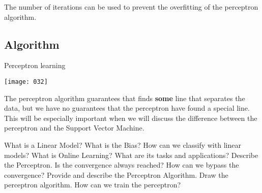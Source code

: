 The number of iterations can be used to prevent the overfitting of the perceptron algorithm.

\subsection{Algorithm}

\begin{algorithm}[h!]
\caption{Perceptron learning}
\label{alg:perceptron}
\end{algorithm}

\begin{center}
    \texttt{[image: 032]}
    \label{fig:032}
\end{center}

The perceptron algorithm guarantees that finds \textbf{some} line that separates the data, but we have no guarantees that the perceptron have found a special line. This will be especially important when we will discuss the difference between the perceptron and the Support Vector Machine.

\newpage
\begin{exercise}[topsep=20pt,itemsep=10pt]
    \ex What is a Linear Model?
    \ex What is the Bias?
    \ex How can we classify with linear models?
    \ex What is Online Learning? What are its tasks and applications?
    \ex Describe the Perceptron. Is the convergence always reached? How can we bypass the convergence?
    \ex[!] Provide and describe the Perceptron Algorithm.
    \ex[!] Draw the perceptron algorithm. How can we train the perceptron?
\end{exercise}